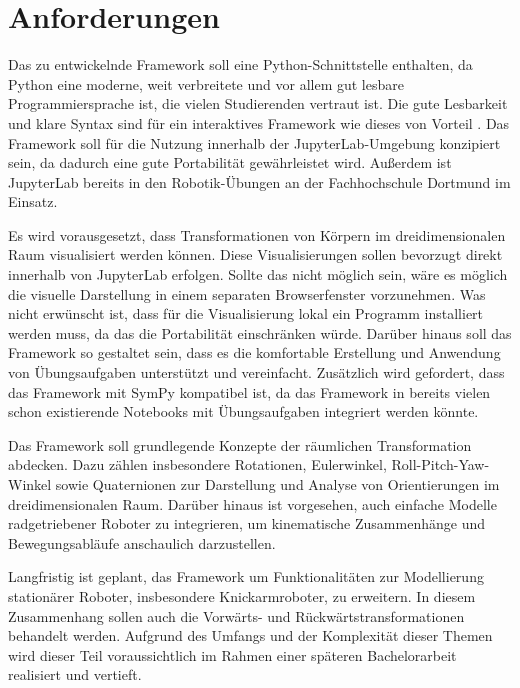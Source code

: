 \section{Anforderungen}
Das zu entwickelnde Framework soll eine Python-Schnittstelle enthalten,
da Python eine moderne, weit verbreitete und vor allem gut lesbare Programmiersprache ist, die vielen Studierenden vertraut ist.
Die gute Lesbarkeit und klare Syntax sind für ein interaktives Framework wie dieses von Vorteil . 
Das Framework soll für die Nutzung innerhalb der JupyterLab-Umgebung konzipiert sein, da dadurch eine gute Portabilität gewährleistet wird.
Außerdem ist JupyterLab bereits in den Robotik-Übungen an der Fachhochschule Dortmund im Einsatz.

Es wird vorausgesetzt, dass Transformationen von Körpern im dreidimensionalen Raum visualisiert werden können.
Diese Visualisierungen sollen bevorzugt direkt innerhalb von JupyterLab erfolgen.
Sollte das nicht möglich sein, wäre es möglich die visuelle Darstellung in einem separaten Browserfenster vorzunehmen.
Was nicht erwünscht ist, dass für die Visualisierung lokal ein Programm installiert werden muss, da das die Portabilität einschränken würde.
Darüber hinaus soll das Framework so gestaltet sein, dass es die komfortable Erstellung und Anwendung von Übungsaufgaben unterstützt und vereinfacht.
Zusätzlich wird gefordert, dass das Framework mit SymPy kompatibel ist, da das Framework in bereits vielen schon existierende
Notebooks mit Übungsaufgaben integriert werden könnte.


Das Framework soll grundlegende Konzepte der räumlichen Transformation abdecken.
Dazu zählen insbesondere Rotationen, Eulerwinkel, Roll-Pitch-Yaw-Winkel sowie Quaternionen zur Darstellung und Analyse von Orientierungen im dreidimensionalen Raum.
Darüber hinaus ist vorgesehen, auch einfache Modelle radgetriebener Roboter zu integrieren, um kinematische Zusammenhänge und Bewegungsabläufe anschaulich darzustellen.

Langfristig ist geplant, das Framework um Funktionalitäten zur Modellierung stationärer Roboter, insbesondere Knickarmroboter, zu erweitern.
In diesem Zusammenhang sollen auch die Vorwärts- und Rückwärtstransformationen behandelt werden.
Aufgrund des Umfangs und der Komplexität dieser Themen wird dieser Teil voraussichtlich im Rahmen einer späteren Bachelorarbeit realisiert und vertieft.


